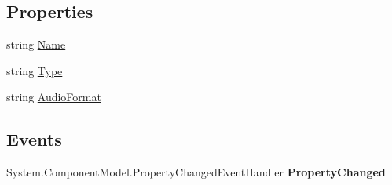 \subsection*{Properties}
\begin{DoxyCompactItemize}
\item 
\hypertarget{class_price___comparison_1_1amazon_1_1ecs_1_1_item_attributes_language_a9cde52e83306139da46a337f27dbf7c3}{string \hyperlink{class_price___comparison_1_1amazon_1_1ecs_1_1_item_attributes_language_a9cde52e83306139da46a337f27dbf7c3}{Name}}\label{class_price___comparison_1_1amazon_1_1ecs_1_1_item_attributes_language_a9cde52e83306139da46a337f27dbf7c3}

\begin{DoxyCompactList}\small\item\em \end{DoxyCompactList}\item 
\hypertarget{class_price___comparison_1_1amazon_1_1ecs_1_1_item_attributes_language_a80ecdb4b44a5b2ff0e4952ee24fb57f8}{string \hyperlink{class_price___comparison_1_1amazon_1_1ecs_1_1_item_attributes_language_a80ecdb4b44a5b2ff0e4952ee24fb57f8}{Type}}\label{class_price___comparison_1_1amazon_1_1ecs_1_1_item_attributes_language_a80ecdb4b44a5b2ff0e4952ee24fb57f8}

\begin{DoxyCompactList}\small\item\em \end{DoxyCompactList}\item 
\hypertarget{class_price___comparison_1_1amazon_1_1ecs_1_1_item_attributes_language_a1a2c616bf8bf3d629bba8a91d46197bc}{string \hyperlink{class_price___comparison_1_1amazon_1_1ecs_1_1_item_attributes_language_a1a2c616bf8bf3d629bba8a91d46197bc}{Audio\-Format}}\label{class_price___comparison_1_1amazon_1_1ecs_1_1_item_attributes_language_a1a2c616bf8bf3d629bba8a91d46197bc}

\begin{DoxyCompactList}\small\item\em \end{DoxyCompactList}\end{DoxyCompactItemize}
\subsection*{Events}
\begin{DoxyCompactItemize}
\item 
\hypertarget{class_price___comparison_1_1amazon_1_1ecs_1_1_item_attributes_language_a0712047dfb217f389460cebc6250c1f8}{System.\-Component\-Model.\-Property\-Changed\-Event\-Handler {\bfseries Property\-Changed}}\label{class_price___comparison_1_1amazon_1_1ecs_1_1_item_attributes_language_a0712047dfb217f389460cebc6250c1f8}

\end{DoxyCompactItemize}
